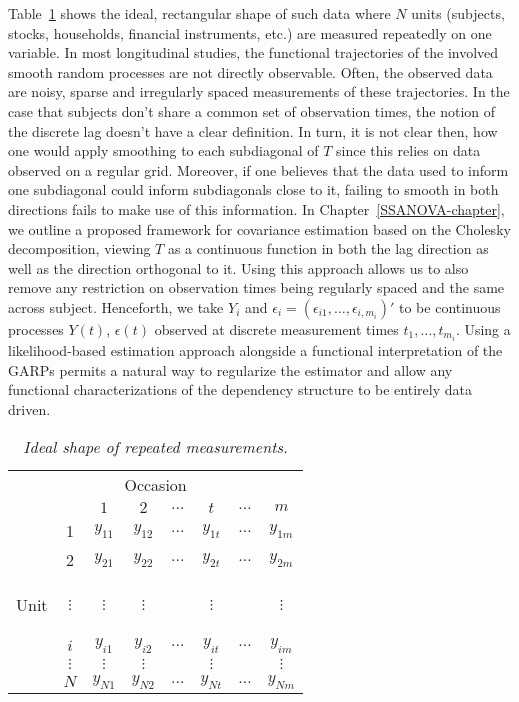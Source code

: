 Table~\ref{table:ideal-repeated-measurements} shows the ideal, rectangular shape of such data where $N$ units (subjects, stocks, households, financial instruments, etc.) are measured repeatedly on one variable. In most longitudinal studies, the functional trajectories of the involved smooth random processes are not directly observable. Often, the observed data are noisy, sparse and irregularly spaced measurements of these trajectories. In the case that subjects don't share a common set of observation times, the notion of the discrete lag doesn't have a clear definition. In turn, it is not clear then, how one would apply smoothing to each subdiagonal of $T$ since this relies on data observed on a regular grid. Moreover, if one believes that the data used to inform one subdiagonal could inform subdiagonals close to it, failing to smooth in both directions fails to make use of this information. In Chapter~\ref{SSANOVA-chapter}, we outline a proposed framework for covariance estimation based on the Cholesky decomposition, viewing $T$ as a continuous function in both the lag direction as well as the direction orthogonal to it. Using this approach allows us to also remove any restriction on observation times being regularly spaced and the same across subject. Henceforth, we take $Y_i$ and $\epsilon_i = \left(\epsilon_{i1}, \dots, \epsilon_{i, m_i} \right)'$ to be continuous processes $Y\left(t\right)$, $\epsilon\left(t\right)$ observed at discrete measurement times $t_1,\dots, t_{m_i}$. Using a likelihood-based estimation approach alongside a functional interpretation of the GARPs permits a natural way to regularize the estimator and allow any functional characterizations of the dependency structure to be entirely data driven. 

\begin{table}[H]
\centering
\caption{\textit{Ideal shape of repeated measurements.}}
\begin{tabular}{cc|cccccc}
\multicolumn{8}{c}{Occasion}\\
& & $1$&$2$ &  $\dots$ & $t$ & $\dots$ & $m$ \\ \midrule
& 1 & $y_{11}$&$y_{12}$ &$\dots$ & $y_{1t}$ & $\dots$& $y_{1m}$ \\
& 2 & $y_{21}$&$y_{22}$ &$\dots$ & $y_{2t}$ & $\dots$& $y_{2m}$ \\
\begin{rotate}{90}%
\mbox{Unit}\end{rotate} & $\vdots$ &$\vdots$&$\vdots$ & &$\vdots$ & & $\vdots$ \\
& $i$ & $y_{i1}$&$y_{i2}$ &$\dots$ & $y_{it}$ & $\dots$& $y_{im}$ \\
 & $\vdots$ &$\vdots$&$\vdots$ & &$\vdots$ & & $\vdots$ \\
 & $N$ & $y_{N1}$&$y_{N2}$ &$\dots$ & $y_{Nt}$ & $\dots$& $y_{Nm}$ \\
\end{tabular} \label{table:ideal-repeated-measurements}
\end{table}

